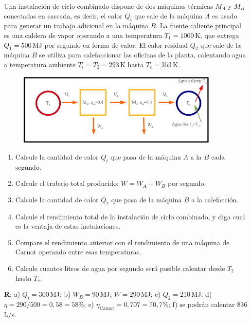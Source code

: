 \documentclass[a4paper,12pt]{article}
\begin{document}
\begin{enumerate}
		Una instalación de ciclo combinado dispone de dos máquinas térmicas
		$M_A$ y $M_B$ conectadas en cascada, es decir, el calor $Q_i$ que sale
		de la máquina $A$ es usado para generar un trabajo adicional en la
		máquina $B$.  La fuente caliente principal es una caldera de vapor
		operando a una temperatura $T_1=1000$\,K, que entrega $Q_1=500$\,MJ por
		segundo en forma de calor. El calor residual $Q_2$ que sale de la
		máquina $B$ se utiliza para calefaccionar las oficinas de la planta,
		calentando agua a temperatura ambiente $T_i=T_2=293$\,K hasta
		$T_c=353$\,K.
		\begin{figure}[hhhhhb!]
			\centering
			\includegraphics[width=0.9\textwidth]{maq2}
		\end{figure}
		\begin{enumerate}
			\item Calcule la cantidad de calor $Q_i$ que pasa de la máquina $A$
				a la $B$ cada segundo.
			\item Calcule el trabajo total producido:
					$W=W_A+W_B$ por segundo.
			\item Calcule la cantidad de calor $Q_2$ que pasa de la máquina $B$
				a la calefacción.
			\item Calcule el rendimiento total de la instalación de ciclo
				combinado, y diga cual es la ventaja de estas instalaciones.
			\item Compare el rendimiento anterior con el rendimiento de una
				máquina de Carnot operando entre esas temperaturas.
			\item Calcule cuantos litros de agua por segundo será posible
				calentar desde $T_2$ hasta $T_c$.
		\end{enumerate}
		{\bf{R}}: a) $Q_i=300$\,MJ; b) $W_B=90$\,MJ; $W=290$\,MJ; c)
		$Q_2=210$\,MJ; d) $\eta=290/500=0,58=58\%$; e)
		$\eta_{\mathrm{Carnot}}=0,707=70,7\%$; f) se podrán calentar
		$836$\,L/s. 
\end{enumerate}
\end{document}
